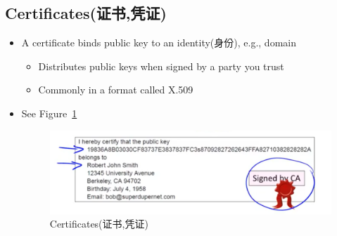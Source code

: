 \documentclass[12pt]{ctexart}   %
\begin{document}
	\subsection{Certificates(证书,凭证)}
	\begin{itemize}
		\item A certificate binds public key to an identity(身份), e.g., domain
		\begin{itemize}
			\item Distributes public keys when signed by a party you trust 
			\item Commonly in a format called X.509
		\end{itemize}
		\item See Figure~\ref{fig:10-5-2}
		  
		\begin{figure}[h!] %
		\centering
		\includegraphics[scale=0.7]{images/10-5-2}
		\caption{Certificates(证书,凭证)}
		\label{fig:10-5-2}
		\end{figure}
	\end{itemize}
\end{document}
